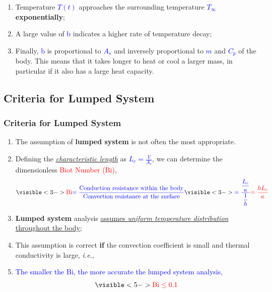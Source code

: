 \documentclass[10pt,compress,unknownkeysallowed]{beamer}
\newcommand{\ie}{{\it i.e., }}
\newcommand{\frc}{\displaystyle\frac}
\newcommand{\red}{\textcolor{red}}
\newcommand{\blue}{\textcolor{blue}}
\newcommand{\dimensionless}[1]{\mathrm{#1}}
\newcommand{\Bi}{\dimensionless{Bi}}
\begin{document}
\begin{frame}
\begin{enumerate}
\begin{enumerate}
           \item<5-> Temperature \blue{$T(t)$} approaches the surrounding temperature \blue{$T_{\infty}$} {\bf exponentially};
           \item<6-> A large value of \blue{b} indicates a higher rate of temperature decay;
           \item<7-> Finally, \blue{b} is proportional to \blue{$A_{s}$} and inversely proportional to \blue{$m$} and \blue{$C_{p}$} of the body. This means that it takes longer to heat or cool a larger mass, in particular if it also has a large heat capacity.
        \end{enumerate}
   \end{enumerate}
\end{frame}


\subsection{Criteria for Lumped System}


\begin{frame}
 \frametitle{Criteria for Lumped System}
   \begin{enumerate}%
     \item<1-> The assumption of {\bf lumped system} is not often the most appropriate. 
     \item<2-> Defining the \underline{\it characteristic length} as \blue{$L_{c}=\frc{V}{A_{s}}$}, we can determine the dimensionless \red{Biot Number ($\Bi$)},
       \begin{equation}
          \visible<3->{\red{\Bi} \blue{= \frc{\text{Conduction resistance within the body}}{\text{Convection resistance at the surface}}}} \visible<3->{\blue{= \frc{\frc{L_{c}}{\kappa}}{\frc{1}{h}}} \red{= \frc{h L_{c}}{\kappa}}}
       \end{equation}  
     \item<4-> {\bf Lumped system} analysis \underline{assumes {\it uniform temperature distribution}} \underline{throughout the body};
     \item<4-> This assumption is correct {\bf if} the convection coefficient is small and thermal conductivity is large, \ie
     \item<5-> \blue{The smaller the {\bf $\Bi$}, the more accurate the lumped system analysis,} 
                     \begin{displaymath}
                       \visible<5->{ \red{\Bi \leq 0.1}}
                     \end{displaymath}
   \end{enumerate}
\end{frame}
\end{document}
